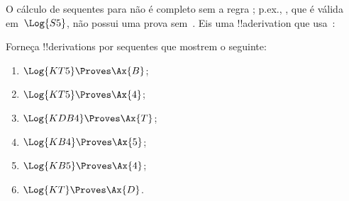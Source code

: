 \documentclass[../../../include/open-logic-section]{subfiles}
\begin{document}
\begin{ex}
O cálculo de sequentes para  não é completo sem a regra
\Cut{}; p.ex., , que é válida em~$\Log{S5}$, não possui uma prova
sem~\Cut. Eis uma !!a{derivation} que usa~\Cut:
\begin{prooftree}
\end{prooftree}
\end{ex}

\begin{prob}
Forneça !!{derivation}s por sequentes que mostrem o seguinte:
  \begin{enumerate}
  \item $\Log{KT5} \Proves \Ax{B}$;
  \item $\Log{KT5} \Proves \Ax{4}$;
  \item $\Log{KDB4} \Proves \Ax{T}$;
  \item $\Log{KB4} \Proves \Ax{5}$;
  \item $\Log{KB5} \Proves \Ax{4}$;
  \item $\Log{KT} \Proves \Ax{D}$.
  \end{enumerate}
\end{prob}
\end{document}
